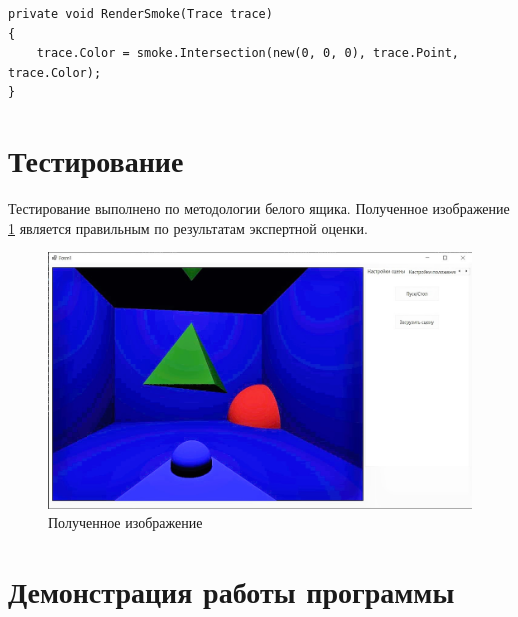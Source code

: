 \begin{lstlisting}[label=lst:particleraytrace,caption=Метод отрисовки частиц дыма.]
private void RenderSmoke(Trace trace)
{
	trace.Color = smoke.Intersection(new(0, 0, 0), trace.Point, trace.Color);
}
\end{lstlisting}

\section{Тестирование}
Тестирование выполнено по методологии белого ящика. Полученное изображение \ref{fig:test} является правильным по результатам экспертной оценки.
\begin{figure}[H]
	\centering
	\includegraphics[width=1\linewidth]{inc/img/democlear}
	\caption{Полученное изображение}
	\label{fig:test}
\end{figure}

\section{Демонстрация работы программы}

